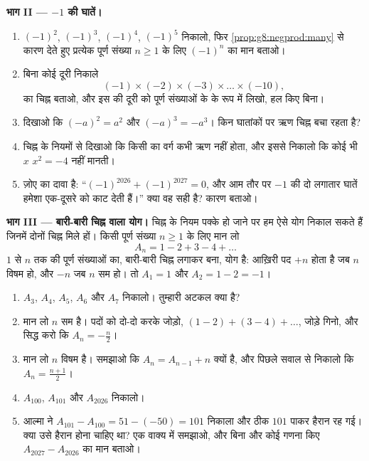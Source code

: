 \begin{problem}
\medskip
\noindent\textbf{भाग II --- $-1$ की घातें।}
\begin{enumerate}[resume]
  \item $(-1)^2$, $(-1)^3$, $(-1)^4$, $(-1)^5$ निकालो, फिर
        \cref{prop:g8:negprod:many} से कारण देते हुए प्रत्येक पूर्ण
        संख्या $n \geq 1$ के लिए $(-1)^n$ का मान बताओ।
  \item बिना कोई दूरी निकाले
        \[
        (-1) \times (-2) \times (-3) \times \dots \times (-10),
        \]
        का चिह्न बताओ, और इस  की दूरी को पूर्ण संख्याओं के
         के रूप में लिखो, हल किए बिना।
  \item दिखाओ कि $(-a)^2 = a^2$ और $(-a)^3 = -a^3$। किन घातांकों पर
        ऋण चिह्न बचा रहता है?
  \item चिह्न के नियमों से दिखाओ कि किसी  का वर्ग कभी
        ऋण नहीं होता, और इससे निकालो कि कोई भी  $x$
        $x^2 = -4$ नहीं मानती।
  \item ज़ोए का दावा है: ``$(-1)^{2026} + (-1)^{2027} = 0$, और आम
        तौर पर $-1$ की दो लगातार घातें हमेशा एक-दूसरे को काट देती
        हैं।'' क्या वह सही है? कारण बताओ।
\end{enumerate}

\medskip
\noindent\textbf{भाग III --- बारी-बारी चिह्न वाला योग।}
चिह्न के नियम पक्के हो जाने पर हम ऐसे योग निकाल सकते हैं जिनमें
दोनों चिह्न मिले हों। किसी पूर्ण संख्या $n \geq 1$ के लिए मान लो
\[
A_n = 1 - 2 + 3 - 4 + \dots
\]
$1$ से $n$ तक की पूर्ण संख्याओं का, बारी-बारी चिह्न लगाकर बना, योग
है: आख़िरी पद $+n$ होता है जब $n$ विषम हो, और $-n$ जब $n$ सम हो।
तो $A_1 = 1$ और $A_2 = 1 - 2 = -1$।
\begin{enumerate}[resume]
  \item $A_3$, $A_4$, $A_5$, $A_6$ और $A_7$ निकालो। तुम्हारी अटकल
        क्या है?
  \item मान लो $n$ सम है। पदों को दो-दो करके जोड़ो,
        $(1 - 2) + (3 - 4) + \dots$, जोड़े गिनो, और सिद्ध करो कि
        $A_n = -\frac{n}{2}$।
  \item मान लो $n$ विषम है। समझाओ कि $A_n = A_{n-1} + n$ क्यों है,
        और पिछले सवाल से निकालो कि $A_n = \frac{n + 1}{2}$।
  \item $A_{100}$, $A_{101}$ और $A_{2026}$ निकालो।
  \item आल्मा ने $A_{101} - A_{100} = 51 - (-50) = 101$ निकाला और
        ठीक $101$ पाकर हैरान रह गई। क्या उसे हैरान होना चाहिए था?
        एक वाक्य में समझाओ, और बिना और कोई गणना किए
        $A_{2027} - A_{2026}$ का मान बताओ।
\end{enumerate}
\end{problem}
